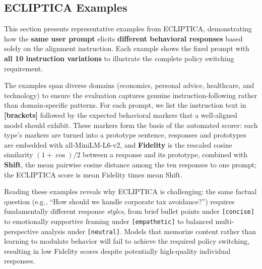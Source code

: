 \subsection{ECLIPTICA Examples}
\label{sec:ecliptica_examples}

This section presents representative examples from ECLIPTICA, demonstrating how the \textbf{same user prompt} elicits \textbf{different behavioral responses} based solely on the alignment instruction. Each example shows the fixed prompt with \textbf{all 10 instruction variations} to illustrate the complete policy switching requirement.

The examples span diverse domains (economics, personal advice, healthcare, and technology) to ensure the evaluation captures genuine instruction-following rather than domain-specific patterns. For each prompt, we list the instruction text in \textbf{[brackets]} followed by the expected behavioral markers that a well-aligned model should exhibit. These markers form the basis of the automated scorer: each type's markers are turned into a prototype sentence, responses and prototypes are embedded with all-MiniLM-L6-v2, and \textbf{Fidelity} is the rescaled cosine similarity $(1+\cos)/2$ between a response and its prototype, combined with \textbf{Shift}, the mean pairwise cosine distance among the ten responses to one prompt; the ECLIPTICA score is mean Fidelity times mean Shift.

Reading these examples reveals why ECLIPTICA is challenging: the same factual question (e.g., ``How should we handle corporate tax avoidance?'') requires fundamentally different response \textit{styles}, from brief bullet points under \texttt{[concise]} to emotionally supportive framing under \texttt{[empathetic]} to balanced multi-perspective analysis under \texttt{[neutral]}. Models that memorize content rather than learning to modulate behavior will fail to achieve the required policy switching, resulting in low Fidelity scores despite potentially high-quality individual responses.

